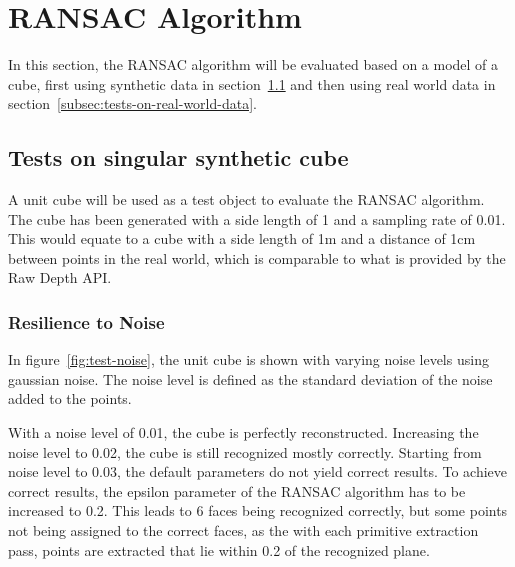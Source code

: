 \section{RANSAC Algorithm}\label{sec:eval-ransac-algorithm}
In this section, the RANSAC algorithm will be evaluated based on a model of a cube,
first using synthetic data in section~\ref{subsec:tests-on-singular-synthetic-cube} and then using real world data
in section~\ref{subsec:tests-on-real-world-data}.

\subsection{Tests on singular synthetic cube}\label{subsec:tests-on-singular-synthetic-cube}

A unit cube will be used as a test object to evaluate the RANSAC algorithm.
The cube has been generated with a side length of 1 and a sampling rate of 0.01.
This would equate to a cube with a side length of 1m and a distance of 1cm between points in the real world,
which is comparable to what is provided by the Raw Depth API\@.

\subsubsection{Resilience to Noise}
In figure~\ref{fig:test-noise}, the unit cube is shown with varying noise levels using gaussian noise.
The noise level is defined as the standard deviation of the noise added to the points.

With a noise level of 0.01, the cube is perfectly reconstructed.
Increasing the noise level to 0.02, the cube is still recognized mostly correctly.
Starting from noise level to 0.03, the default parameters do not yield correct results.
To achieve correct results, the epsilon parameter of the RANSAC algorithm has to be increased to 0.2.
This leads to 6 faces being recognized correctly, but some points not being assigned to the correct faces,
as the with each primitive extraction pass, points are extracted that lie within 0.2 of the recognized plane.


